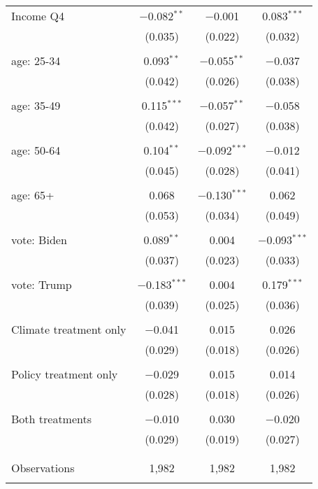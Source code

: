 \begin{tabular}{@{\extracolsep{5pt}}lccc}
 Income Q4 & $-$0.082$^{**}$ & $-$0.001 & 0.083$^{***}$ \\ 
  & (0.035) & (0.022) & (0.032) \\ 
  & & & \\ 
 age: 25-34 & 0.093$^{**}$ & $-$0.055$^{**}$ & $-$0.037 \\ 
  & (0.042) & (0.026) & (0.038) \\ 
  & & & \\ 
 age: 35-49 & 0.115$^{***}$ & $-$0.057$^{**}$ & $-$0.058 \\ 
  & (0.042) & (0.027) & (0.038) \\ 
  & & & \\ 
 age: 50-64 & 0.104$^{**}$ & $-$0.092$^{***}$ & $-$0.012 \\ 
  & (0.045) & (0.028) & (0.041) \\ 
  & & & \\ 
 age: 65+ & 0.068 & $-$0.130$^{***}$ & 0.062 \\ 
  & (0.053) & (0.034) & (0.049) \\ 
  & & & \\ 
 vote: Biden & 0.089$^{**}$ & 0.004 & $-$0.093$^{***}$ \\ 
  & (0.037) & (0.023) & (0.033) \\ 
  & & & \\ 
 vote: Trump & $-$0.183$^{***}$ & 0.004 & 0.179$^{***}$ \\ 
  & (0.039) & (0.025) & (0.036) \\ 
  & & & \\ 
 Climate treatment only & $-$0.041 & 0.015 & 0.026 \\ 
  & (0.029) & (0.018) & (0.026) \\ 
  & & & \\ 
 Policy treatment only & $-$0.029 & 0.015 & 0.014 \\ 
  & (0.028) & (0.018) & (0.026) \\ 
  & & & \\ 
 Both treatments & $-$0.010 & 0.030 & $-$0.020 \\ 
  & (0.029) & (0.019) & (0.027) \\ 
  & & & \\ 
\hline \\[-1.8ex] 

Observations & 1,982 & 1,982 & 1,982 \\ 
\hline 
\hline \\[-1.8ex] 
\end{tabular} 